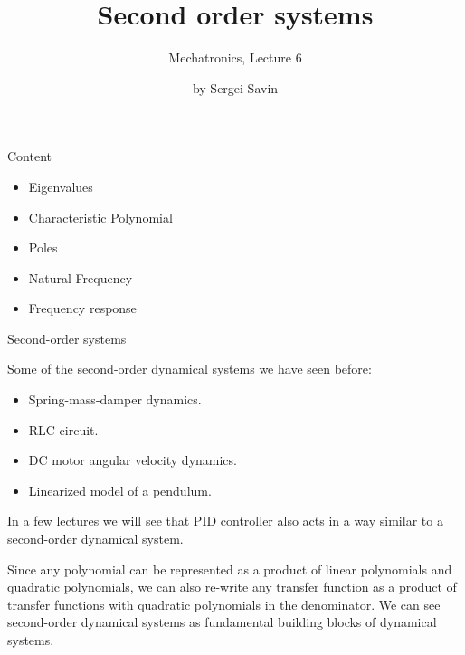 \documentclass{beamer}
\title{Second order systems}
\subtitle{Mechatronics, Lecture 6}
\author{by Sergei Savin}
\date{\mydate}
\begin{document}
\maketitle



\begin{frame}{Content}
\begin{itemize}
\item Eigenvalues
\item Characteristic Polynomial
\item Poles
\item Natural Frequency
\item Frequency response
\end{itemize}
\end{frame}





\begin{frame}{Second-order systems}
	\begin{flushleft}
		
		Some of the second-order dynamical systems we have seen before:
		
		\begin{itemize}
			\item Spring-mass-damper dynamics.
			\item RLC circuit.
			\item DC motor angular velocity dynamics.
			\item Linearized model of a pendulum.
		\end{itemize}
	
		In a few lectures we will see that PID controller also acts in a way similar to a second-order dynamical system.
		
		\bigskip
		
		Since any polynomial can be represented as a product of linear polynomials and quadratic polynomials, we can also re-write any transfer function as a product of transfer functions with quadratic polynomials in the denominator. We can see second-order dynamical systems as fundamental building blocks of dynamical systems.
		
	\end{flushleft}
\end{frame}
\end{document}
